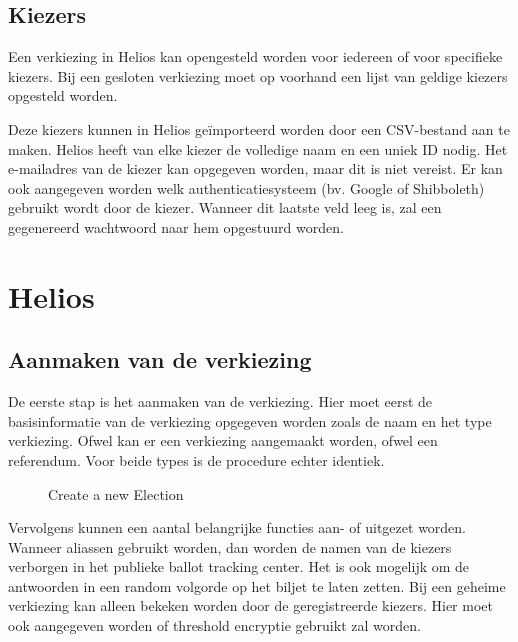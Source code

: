 \subsection{Kiezers}
\label{sec:proc:voorbereiding:kiezers}

Een verkiezing in Helios kan opengesteld worden voor iedereen of voor specifieke kiezers. Bij een gesloten verkiezing moet op voorhand een lijst van geldige kiezers opgesteld worden.

\npar Deze kiezers kunnen in Helios ge\"importeerd worden door een CSV-bestand aan te maken. Helios heeft van elke kiezer de volledige naam en een uniek ID nodig. Het e-mailadres van de kiezer kan opgegeven worden, maar dit is niet vereist. Er kan ook aangegeven worden welk authenticatiesysteem (bv. Google of Shibboleth) gebruikt wordt door de kiezer. Wanneer dit laatste veld leeg is, zal een gegenereerd wachtwoord naar hem opgestuurd worden.

\section{Helios}
\label{sec:proc:helios}

\subsection{Aanmaken van de verkiezing}

De eerste stap is het aanmaken van de verkiezing. Hier moet eerst de basisinformatie van de verkiezing opgegeven worden zoals de naam en het type verkiezing. Ofwel kan er een verkiezing aangemaakt worden, ofwel een referendum. Voor beide types is de procedure echter identiek.

\begin{figure}
  \caption{Create a new Election}
  \label{fig:proc:elections_new}
\end{figure}


\npar Vervolgens kunnen een aantal belangrijke functies aan- of uitgezet worden. Wanneer aliassen gebruikt worden, dan worden de namen van de kiezers verborgen in het publieke ballot tracking center. Het is ook mogelijk om de antwoorden in een random volgorde op het biljet te laten zetten. Bij een geheime verkiezing kan alleen bekeken worden door de geregistreerde kiezers. Hier moet ook aangegeven worden of threshold encryptie gebruikt zal worden.

